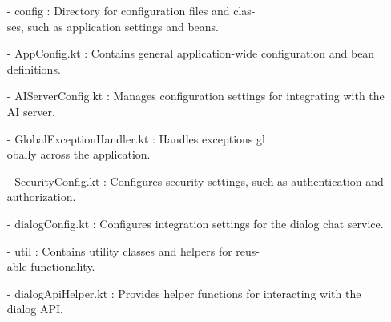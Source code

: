 \documentclass[conference]{IEEEtran}
\begin{document}
\begin{enumerate}
        \item[-] config : Directory for configuration files and clas-\\ses, such as application settings and beans.\\
        \item[-] AppConfig.kt : Contains general application-wide configuration and bean definitions.\\
        \item[-] AIServerConfig.kt : Manages configuration settings for integrating with the AI server.\\
        \item[-] GlobalExceptionHandler.kt : Handles exceptions gl\\obally across the application.\\
        \item[-] SecurityConfig.kt : Configures security settings, such as authentication and authorization.\\
        \item[-] dialogConfig.kt : Configures integration settings for the dialog chat service.\\
        
        \item[-] util : Contains utility classes and helpers for reus-\\able functionality. \\
        \item[-] dialogApiHelper.kt : Provides helper functions for interacting with the dialog API.\\
        
\end{enumerate}
\end{document}
